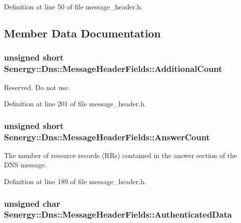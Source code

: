 Definition at line 50 of file message\-\_\-header.\-h.



\subsection{Member Data Documentation}
\hypertarget{struct_senergy_1_1_dns_1_1_message_header_fields_aae6ba21a1c8baa30f0aafe90d165420f}{
\subsubsection[{Additional\-Count}]{\setlength{\rightskip}{0pt plus 5cm}unsigned short Senergy\-::\-Dns\-::\-Message\-Header\-Fields\-::\-Additional\-Count}}\label{struct_senergy_1_1_dns_1_1_message_header_fields_aae6ba21a1c8baa30f0aafe90d165420f}


Reserved. Do not use. 



Definition at line 201 of file message\-\_\-header.\-h.

\hypertarget{struct_senergy_1_1_dns_1_1_message_header_fields_a38e5101ec862c400628d66192c5b9878}{
\subsubsection[{Answer\-Count}]{\setlength{\rightskip}{0pt plus 5cm}unsigned short Senergy\-::\-Dns\-::\-Message\-Header\-Fields\-::\-Answer\-Count}}\label{struct_senergy_1_1_dns_1_1_message_header_fields_a38e5101ec862c400628d66192c5b9878}


The number of resource records (R\-Rs) contained in the answer section of the D\-N\-S message. 



Definition at line 189 of file message\-\_\-header.\-h.

\hypertarget{struct_senergy_1_1_dns_1_1_message_header_fields_a3788cbe9e2663b3be0cad8cbca8dc985}{
\subsubsection[{Authenticated\-Data}]{\setlength{\rightskip}{0pt plus 5cm}unsigned char Senergy\-::\-Dns\-::\-Message\-Header\-Fields\-::\-Authenticated\-Data}}\label{struct_senergy_1_1_dns_1_1_message_header_fields_a3788cbe9e2663b3be0cad8cbca8dc985}


